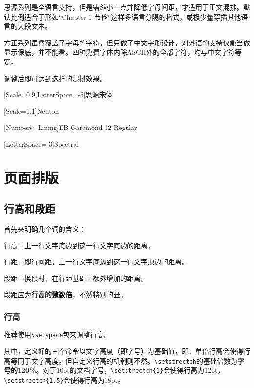 \documentclass[10pt,openany]{book}
\begin{document}
思源系列是全语言支持，但是需缩小一点并降低字母间距，才适用于正文混排。默认比例适合于形如“Chapter 1 节俭”这样多语言分隔的格式，或极少量穿插其他语言的大段文本。

方正系列虽然覆盖了字母的字符，但只做了中文字形设计，对外语的支持仅能当做显示保底，并不能看。四种免费字体内除ASCII外的全部字符，均与中文字符等宽。

调整后即可达到这样的混排效果。

\begin{adjustwidth}{2em}{2em}
    \blankpar

    [Scale=0.9,LetterSpace=-5]思源宋体\testtext

    [Scale=1.1]Neuton\testtext

    [Numbers=Lining]EB Garamond 12 Regular\testtext

    [LetterSpace=-3]Spectral\testtext

    \blankpar
\end{adjustwidth}

\chapter{页面排版}

\section{行高和段距}

首先来明确几个词的含义：

行高：上一行文字底边到这一行文字底边的距离。

行距：即行间距，上一行文字底边到这一行文字顶边的距离。

段距：换段时，在行距基础上额外增加的距离。

段距应为\textbf{行高的整数倍}，不然特别的丑。

\subsection{行高}

推荐使用\texttt{\textbackslash{}setspace}包来调整行高。



其中，定义好的三个命令以文字高度（即字号）为基础值，即，单倍行高会使得行高等同于文字高度。但自定义行高的机制则不然。\texttt{\textbackslash{}setstrectch}的基础倍数为\textbf{字号的120\%}。对于10pt的文档字号，\texttt{\textbackslash{}setstrectch\{1\}}会使得行高为12pt，\texttt{\textbackslash{}setstrectch\{1.5\}}会使得行高为18pt。
\end{document}
